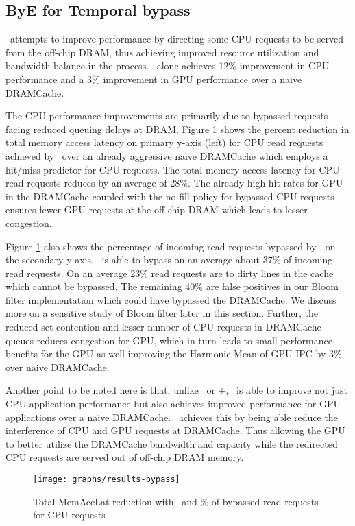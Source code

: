 \subsection{ByE for Temporal bypass}
\bypassname\ attempts to improve performance by directing some CPU requests to be served from the off-chip DRAM, thus achieving improved resource utilization and bandwidth balance in the process. \bypassname\ alone achieves 12\% improvement in CPU performance and a 3\% improvement in GPU performance over a naive DRAMCache.
\par The CPU performance improvements are primarily due to bypassed requests facing reduced queuing delays at DRAM. Figure \ref{results-bloom} shows the percent reduction in total memory access latency on primary y-axis (left) for CPU read requests achieved by \bypassname\ over an already aggressive naive DRAMCache which employs a hit/miss predictor for CPU requests. The total memory access latency for CPU read requests reduces by an average of 28\%. The already high hit rates for GPU in the DRAMCache coupled with the no-fill policy for bypassed CPU requests ensures fewer GPU requests at the off-chip DRAM which leads to lesser congestion. 
\par Figure \ref{results-bloom} also shows the percentage of incoming read requests bypassed by \bypassname, on the secondary y axis. 
\bypassname\ is able to bypass on an average about 37\% of incoming read requests. On an average 23\% read requests are to dirty lines in the cache which cannot be bypassed.  The remaining 40\% are false positives in our Bloom filter implementation which could have bypassed the DRAMCache. We discuss more on a sensitive study of Bloom filter later in this section. Further, the reduced set contention and lesser number of CPU requests in DRAMCache queues reduces congestion for GPU, which in turn leads to small performance benefits for the GPU as well improving the Harmonic Mean of GPU IPC by 3\% over naive DRAMCache.
\par Another point to be noted here is that, unlike \prioname\ or \prioname+\bypassname, \bypassname\ is able to improve not just CPU application performance but also achieves improved performance for GPU applications over a naive DRAMCache. \bypassname\ achieves this by being able reduce the interference of CPU and GPU requests at DRAMCache. Thus allowing the GPU to better utilize the DRAMCache bandwidth and capacity while the redirected CPU requests are served out of off-chip DRAM memory.

\begin{figure}[!htb]
    \centering
    \texttt{[image: graphs/results-bypass]}
    \caption{Total MemAccLat reduction with \bypassname\ and \% of bypassed read requests for CPU requests}
    \label{results-bloom}
\end{figure}

